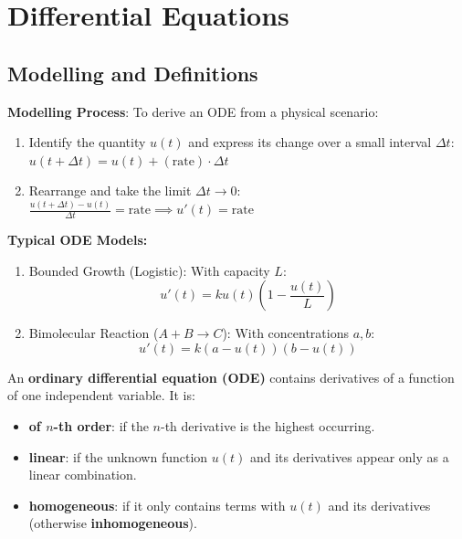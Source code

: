\section{Differential Equations}

\subsection{Modelling and Definitions}

\begin{remark}
    \textbf{Modelling Process}: To derive an ODE from a physical scenario:
    \begin{enumerate}
        \item Identify the quantity $u(t)$ and express its change over a small interval $\Delta t$:
        $u(t+\Delta t) = u(t) + (\text{rate}) \cdot \Delta t$
        \item Rearrange and take the limit $\Delta t \to 0$:
        $\frac{u(t+\Delta t) - u(t)}{\Delta t} = \text{rate} \implies u'(t) = \text{rate}$
    \end{enumerate}
\end{remark}

\begin{remark}
    \textbf{Typical ODE Models:}
    \begin{enumerate}
        \item Bounded Growth (Logistic): With capacity $L$:
        $$u'(t) = k u(t) \left(1 - \frac{u(t)}{L}\right)$$
        \item Bimolecular Reaction ($A + B \to C$): With concentrations $a, b$:
        $$u'(t) = k(a - u(t))(b - u(t))$$
    \end{enumerate}
\end{remark}

\begin{definition}
    An \textbf{ordinary differential equation (ODE)} contains derivatives of a function of one independent variable. It is:
    \begin{itemize}
        \item \textbf{of $n$-th order}: if the $n$-th derivative is the highest occurring.
        \item \textbf{linear}: if the unknown function $u(t)$ and its derivatives appear only as a linear combination.
        \item \textbf{homogeneous}: if it only contains terms with $u(t)$ and its derivatives (otherwise \textbf{inhomogeneous}).
    \end{itemize}
\end{definition}

